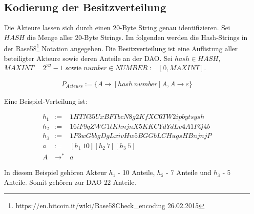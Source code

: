 \documentclass[a4paper,12pt]{report}
\begin{document}
% 
% 
% 
% 


\subsection{Kodierung der Besitzverteilung}
Die Akteure lassen sich durch einen 20-Byte String genau identifizieren. Sei $HASH$ die Menge aller 20-Byte Strings. Im folgenden werden die Hash-Strings in der Base58\footnote{https://en.bitcoin.it/wiki/Base58Check\_encoding 26.02.2015} Notation angegeben. Die Besitzverteilung ist eine Auflistung aller beteiligter Akteure sowie deren Anteile an der DAO.
Sei $hash\in HASH$, $MAXINT = 2^{32}-1$ sowie $number\in NUMBER:=[0,MAXINT]$.

\begin{eqnarray}
P_{Acteurs} := \{A\rightarrow[hash\ number]A,A\rightarrow \varepsilon\}
\end{eqnarray}

Eine Beispiel-Verteilung ist: 

\begin{eqnarray}
  h_1 &:=& 1HTN35UxBFTbcN8g2KfXC6TW2ipbytsysh\\
  h_2 &:=& 16iF9qZWG1tKhnjnX5KKCYdYdLv4A1FQ4b\\
  h_3 &:=& 1P3wGbbgDgLxivHw5BGGbLCHugsHBnjnjP\\
  a &:=& [h_1\ 10][h_2\ 7][h_3\ 5] \\
  A &\rightarrow^*& a
\end{eqnarray}

In diesem Beispiel gehören Akteur $h_1$ - 10 Anteile, $h_2$ - 7 Anteile und $h_3$ - 5 Anteile. Somit gehören zur DAO 22 Anteile.

\end{document}
